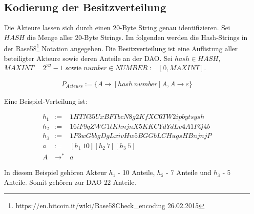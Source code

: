 \documentclass[a4paper,12pt]{report}
\begin{document}
% 
% 
% 
% 


\subsection{Kodierung der Besitzverteilung}
Die Akteure lassen sich durch einen 20-Byte String genau identifizieren. Sei $HASH$ die Menge aller 20-Byte Strings. Im folgenden werden die Hash-Strings in der Base58\footnote{https://en.bitcoin.it/wiki/Base58Check\_encoding 26.02.2015} Notation angegeben. Die Besitzverteilung ist eine Auflistung aller beteiligter Akteure sowie deren Anteile an der DAO.
Sei $hash\in HASH$, $MAXINT = 2^{32}-1$ sowie $number\in NUMBER:=[0,MAXINT]$.

\begin{eqnarray}
P_{Acteurs} := \{A\rightarrow[hash\ number]A,A\rightarrow \varepsilon\}
\end{eqnarray}

Eine Beispiel-Verteilung ist: 

\begin{eqnarray}
  h_1 &:=& 1HTN35UxBFTbcN8g2KfXC6TW2ipbytsysh\\
  h_2 &:=& 16iF9qZWG1tKhnjnX5KKCYdYdLv4A1FQ4b\\
  h_3 &:=& 1P3wGbbgDgLxivHw5BGGbLCHugsHBnjnjP\\
  a &:=& [h_1\ 10][h_2\ 7][h_3\ 5] \\
  A &\rightarrow^*& a
\end{eqnarray}

In diesem Beispiel gehören Akteur $h_1$ - 10 Anteile, $h_2$ - 7 Anteile und $h_3$ - 5 Anteile. Somit gehören zur DAO 22 Anteile.

\end{document}
